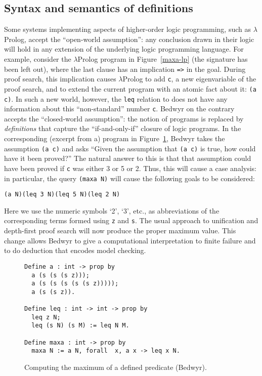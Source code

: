 \documentclass{article}
\newcommand{\lp}{$\lambda$Prolog}
\begin{document}
\subsection{Syntax and semantics of definitions}

Some systems implementing aspects of higher-order logic programming,
such as \lp{}, accept the ``open-world assumption'': any conclusion
drawn in their logic will hold in any extension of the underlying logic
programming language.
For example, consider the \lp{} program in Figure~\ref{maxa-lp} (the
signature has been left out), where the last clause has an implication
\verb.=>. in the goal. During proof search, this implication
causes \lp{} to add \verb.c., a new eigenvariable of the proof search,
and to extend the current program with an atomic fact about it:
\verb.(a c).. In such a new world, however, the {\tt leq} relation to
does not have any information about this ``non-standard'' number
{\tt c}.
Bedwyr on the contrary accepts the ``closed-world assumption'': the
notion of programs is replaced by {\em definitions} that capture the
``if-and-only-if'' closure of logic programs. In the corresponding
(excerpt from a) program in Figure~\ref{maxa-bdw}, Bedwyr takes the
assumption \verb.(a c). and asks ``Given the assumption that
\verb.(a c). is true, how could have it been proved?'' The natural
answer to this is that that assumption could have been proved if
\verb.c. was either 3 or 5 or 2. Thus, this will cause a case analysis:
in particular, the query \verb.(maxa N). will cause the following goals
to be considered:
\begin{center}
  \tt(a N)\qquad(leq 3 N)\qquad(leq 5 N)\qquad(leq 2 N)
\end{center}
Here we use the numeric symbols `2', `3', etc., as abbreviations of the
corresponding terms formed using \texttt{z} and \texttt{s}. The usual
approach to unification and depth-first proof search will now produce
the proper maximum value. This change allows Bedwyr to give a
computational interpretation to finite failure and to do deduction that
encodes model checking.

\begin{figure}
\begin{verbatim}
Define a : int -> prop by
  a (s (s (s z)));
  a (s (s (s (s (s z)))));
  a (s (s z)).

Define leq : int -> int -> prop by
  leq z N;
  leq (s N) (s M) := leq N M.

Define maxa : int -> prop by
  maxa N := a N, forall  x, a x -> leq x N.
\end{verbatim}
\caption{Computing the maximum of a defined predicate (Bedwyr).}
\label{maxa-bdw}
\end{figure}
\end{document}
